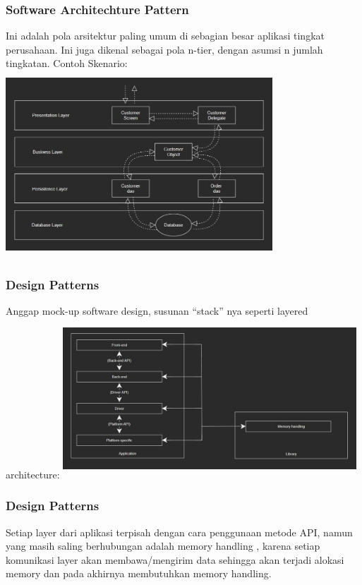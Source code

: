 \documentclass{beamer}
\begin{document}
\begin{frame}
\frametitle{Software Architechture Pattern}
Ini adalah pola arsitektur paling umum di sebagian besar aplikasi tingkat perusahaan. Ini juga dikenal sebagai pola n-tier, dengan asumsi n jumlah tingkatan. Contoh Skenario:
\includegraphics[width=10cm,height=7cm]{../../images/Software Architecture Pattern}
\end{frame}

\begin{frame}
\frametitle{Design Patterns}
Anggap mock-up software design, susunan “stack” nya seperti layered architecture:
\includegraphics[width=11cm,height=6cm]{../../images/Design Pattern}

\end{frame}

\begin{frame}
\frametitle{Design Patterns}
Setiap layer dari aplikasi terpisah dengan cara penggunaan metode API, namun yang masih saling berhubungan adalah memory handling , karena setiap komunikasi layer akan membawa/mengirim data sehingga akan terjadi alokasi memory dan pada akhirnya membutuhkan memory handling.
\end{frame}
\end{document}
